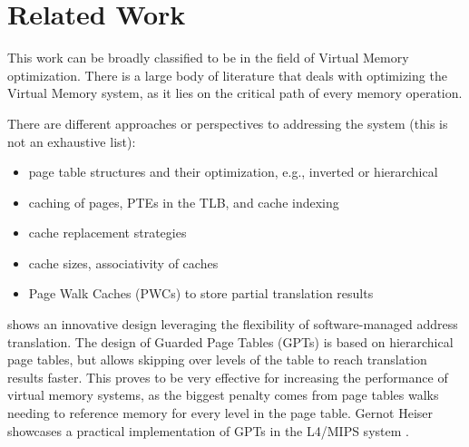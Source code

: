 \chapter{Related Work}

\label{chap:related}
This work can be broadly classified to be in the field of Virtual Memory optimization. There is a large body of literature that deals with optimizing the Virtual Memory system, as it lies on the critical path of every memory operation.

There are different approaches or perspectives to addressing the system (this is not an exhaustive list):

\begin{itemize}
    \item page table structures and their optimization, e.g., inverted or hierarchical
    \item caching of pages, PTEs in the TLB, and cache indexing
    \item cache replacement strategies
    \item cache sizes, associativity of caches
    \item Page Walk Caches (PWCs) to store partial translation results
\end{itemize}



\textbf{\cite{liedtkeGPT}} shows an innovative design leveraging the flexibility of software-managed
address translation.
The design of Guarded Page Tables (GPTs) is based on hierarchical page tables, but allows skipping over levels of the table to reach translation results faster.
This proves to be very effective for increasing the performance of virtual memory systems, as the biggest penalty comes from page tables walks needing to reference memory for every level in the page table.
Gernot Heiser showcases a practical implementation of GPTs in the L4/MIPS system \cite{heiserAnatomyHighPerformanceMicrokernel}.




